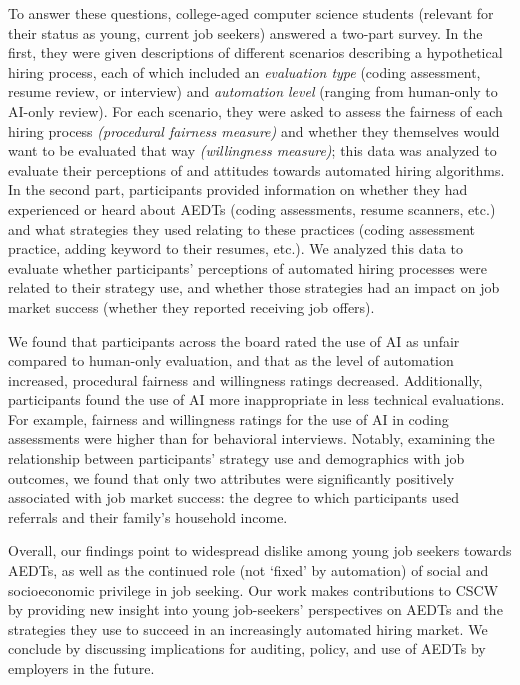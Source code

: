 To answer these questions, college-aged computer science students (relevant for their status as young, current job seekers) answered a two-part survey. In the first, they were given descriptions of different scenarios describing a hypothetical hiring process, each of which included an \textit{evaluation type} (coding assessment, resume review, or interview) and \textit{automation level} (ranging from human-only to AI-only review). For each scenario, they were asked to assess the fairness of each hiring process \textit{(procedural fairness measure)} and whether they themselves would want to be evaluated that way \textit{(willingness measure)}; this data was analyzed to evaluate their perceptions of and attitudes towards automated hiring algorithms. In the second part, participants provided information on whether they had experienced or heard about AEDTs (coding assessments, resume scanners, etc.) and what strategies they used relating to these practices (coding assessment practice, adding keyword to their resumes, etc.). We analyzed this data to evaluate whether participants' perceptions of automated hiring processes were related to their strategy use, and whether those strategies had an impact on job market success (whether they reported receiving job offers).

We found that participants across the board rated the use of AI as unfair compared to human-only evaluation, and that as the level of automation increased, procedural fairness and willingness ratings decreased. Additionally, participants found the use of AI more inappropriate in less technical evaluations. For example, fairness and willingness ratings for the use of AI in coding assessments were higher than for behavioral interviews. Notably, examining the relationship between participants' strategy use and demographics with job outcomes, we found that only two attributes were significantly positively associated with job market success: the degree to which participants used referrals and their family's household income. 

Overall, our findings point to widespread dislike among young job seekers towards AEDTs, as well as the continued role (not `fixed' by automation) of social and socioeconomic privilege in job seeking. Our work makes contributions to CSCW by providing new insight into young job-seekers' perspectives on AEDTs and the strategies they use to succeed in an increasingly automated hiring market. We conclude by discussing implications for auditing, policy, and use of AEDTs by employers in the future.